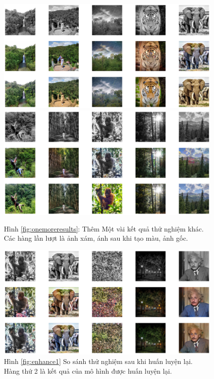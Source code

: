 \documentclass[a4paper, 12pt]{article}
\begin{document}
\begin{figure}[!h]
\captionsetup{width=0.8\textwidth}
\centering
\includegraphics[width=15cm]{images/demo3.png}
\includegraphics[width=15cm]{images/demo4.png}
\caption*{Hình \ref{fig:onemoreresults}: Thêm Một vài kết quả thử nghiệm khác. Các hàng lần lượt là ảnh xám, ánh sau khi tạo màu, ảnh gốc.}
\end{figure}

\begin{figure}[!h]
\captionsetup{width=0.8\textwidth}
\centering
\includegraphics[width=15cm]{images/enhance.png}
\caption*{Hình \ref{fig:enhance1} So sánh thử nghiệm sau khi huấn luyện lại. Hàng thứ 2 là kết quả của mô hình được huấn luyện lại.}
\end{figure}
\end{document}
